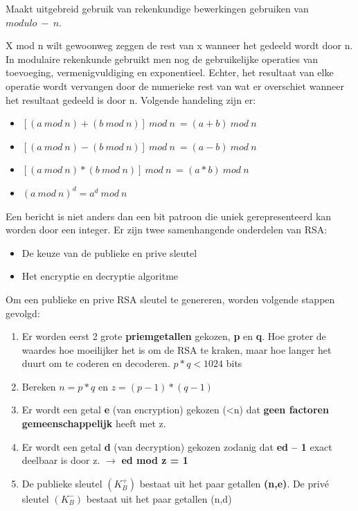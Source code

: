 
Maakt uitgebreid gebruik van rekenkundige bewerkingen gebruiken van $modulo \ - \ n$.

\noindent X mod n wilt gewoonweg zeggen de rest van x wanneer het gedeeld wordt door n. In modulaire rekenkunde gebruikt men nog de gebruikelijke operaties van toevoeging, vermenigvuldiging en exponentieel. Echter, het resultaat van elke operatie wordt vervangen door de numerieke rest van wat er overschiet wanneer het resultaat gedeeld is door n.
Volgende handeling zijn er:

\begin{itemize}

\item $[(a\ mod\ n)  + (b\ mod\ n)] \ mod\ n\ = (a + b)\ mod\ n$
\item $[(a\ mod\ n) - (b\ mod\ n)] \ mod\ n\ = (a - b)\ mod\ n$
\item $[(a\ mod\ n) * (b\ mod\ n)] \ mod\ n\ = (a * b)\ mod\ n$
\item $(a\ mod\ n)^d = a^d\ mod\ n$
\end{itemize}
Een bericht is niet anders dan een bit patroon die uniek gerepresenteerd kan worden door een integer. Er zijn twee samenhangende onderdelen van RSA:

\begin{itemize}
\item De keuze van de publieke en prive sleutel
\item Het encryptie en decryptie algoritme
\end{itemize}


Om een publieke en prive RSA sleutel te genereren, worden volgende stappen gevolgd:

\begin{enumerate}
\item Er worden eerst 2 grote \textbf{priemgetallen} gekozen, \textbf{p} en \textbf{q}. Hoe groter de waardes hoe moeilijker het is om de RSA te kraken, maar hoe langer het duurt om te coderen en decoderen. $p*q < 1024$ bits
\item Bereken $n = p*q$ en $z = (p - 1)*(q - 1)$
\item Er wordt een getal \textbf{e} (van encryption) gekozen (<n) dat \textbf{geen factoren gemeenschappelijk} heeft met z.
\item Er wordt een getal \textbf{d} (van decryption) gekozen zodanig dat \textbf{ed – 1} exact deelbaar is door z. $\rightarrow$ \textbf{ed mod z = 1}
\item De publieke sleutel $(K^+_B)$ bestaat uit het paar getallen \textbf{(n,e)}. De privé sleutel $(K^-_B)$ bestaat uit het paar getallen (n,d)
\end{enumerate}

